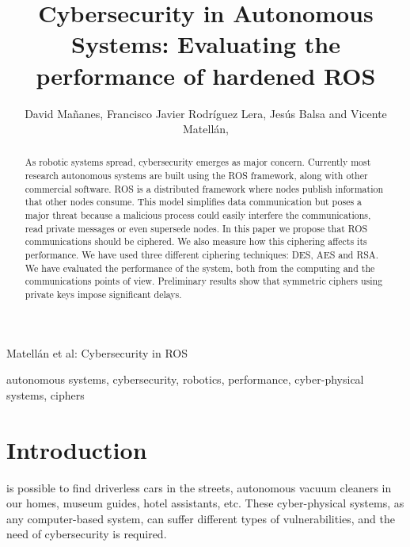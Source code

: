 \documentclass[journal,twoside]{JoPhA}
\begin{document}
\title{Cybersecurity in Autonomous Systems: Evaluating the performance of hardened ROS}

\author{David Ma\~nanes, Francisco Javier Rodr\'iguez Lera, Jes\'us Balsa and Vicente Matell\'an,
}

%
{Matell\'an et al: Cybersecurity in ROS}
\maketitle


\begin{abstract}
As robotic systems spread, cybersecurity emerges as major concern. Currently most research autonomous systems are built using the ROS framework, along with other commercial software. 
ROS is a distributed framework where nodes publish information that other nodes consume. 
This model simplifies data communication but poses a major threat because a malicious process could easily interfere the communications, read private messages or even supersede nodes. In this paper we propose that ROS communications should be ciphered. We also measure how this ciphering affects its performance. We have used three different ciphering techniques: DES, AES and RSA. We have evaluated the performance of the system, both from the computing and the communications points of view. Preliminary results show that symmetric ciphers using private keys impose significant delays.

\end{abstract}


\begin{IEEEkeywords}
autonomous systems, cybersecurity, robotics, performance, cyber-physical systems, ciphers
\end{IEEEkeywords}


\section{Introduction}


 is possible to find driverless cars in the streets, autonomous vacuum cleaners in our homes, museum guides, hotel assistants, etc. These cyber-physical systems, as any computer-based system, can suffer different types of vulnerabilities, and the need of cybersecurity \cite{Morante2015} is required. 
\end{document}
